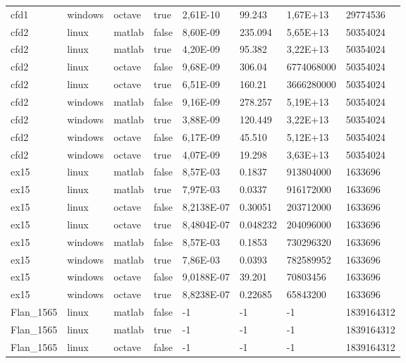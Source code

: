 \begin{small}
\begin{longtable}{|l|l|l|l|l|l|l|l|}
cfd1            & windows & octave & true  & 2,61E-10   & 99.243   & 1,67E+13   & 29774536   \\
cfd2            & linux   & matlab & false & 8,60E-09   & 235.094  & 5,65E+13   & 50354024   \\
cfd2            & linux   & matlab & true  & 4,20E-09   & 95.382   & 3,22E+13   & 50354024   \\
cfd2            & linux   & octave & false & 9,68E-09   & 306.04   & 6774068000 & 50354024   \\
cfd2            & linux   & octave & true  & 6,51E-09   & 160.21   & 3666280000 & 50354024   \\
cfd2            & windows & matlab & false & 9,16E-09   & 278.257  & 5,19E+13   & 50354024   \\
cfd2            & windows & matlab & true  & 3,88E-09   & 120.449  & 3,22E+13   & 50354024   \\
cfd2            & windows & octave & false & 6,17E-09   & 45.510   & 5,12E+13   & 50354024   \\
cfd2            & windows & octave & true  & 4,07E-09   & 19.298   & 3,63E+13   & 50354024   \\
ex15            & linux   & matlab & false & 8,57E-03   & 0.1837   & 913804000  & 1633696    \\
ex15            & linux   & matlab & true  & 7,97E-03   & 0.0337   & 916172000  & 1633696    \\
ex15            & linux   & octave & false & 8,2138E-07 & 0.30051  & 203712000  & 1633696    \\
ex15            & linux   & octave & true  & 8,4804E-07 & 0.048232 & 204096000  & 1633696    \\
ex15            & windows & matlab & false & 8,57E-03   & 0.1853   & 730296320  & 1633696    \\
ex15            & windows & matlab & true  & 7,86E-03   & 0.0393   & 782589952  & 1633696    \\
ex15            & windows & octave & false & 9,0188E-07 & 39.201   & 70803456   & 1633696    \\
ex15            & windows & octave & true  & 8,8238E-07 & 0.22685  & 65843200   & 1633696    \\
Flan\_1565      & linux   & matlab & false & -1         & -1       & -1         & 1839164312 \\
Flan\_1565      & linux   & matlab & true  & -1         & -1       & -1         & 1839164312 \\
Flan\_1565      & linux   & octave & false & -1         & -1       & -1         & 1839164312 \\

\end{longtable}
\end{small}
